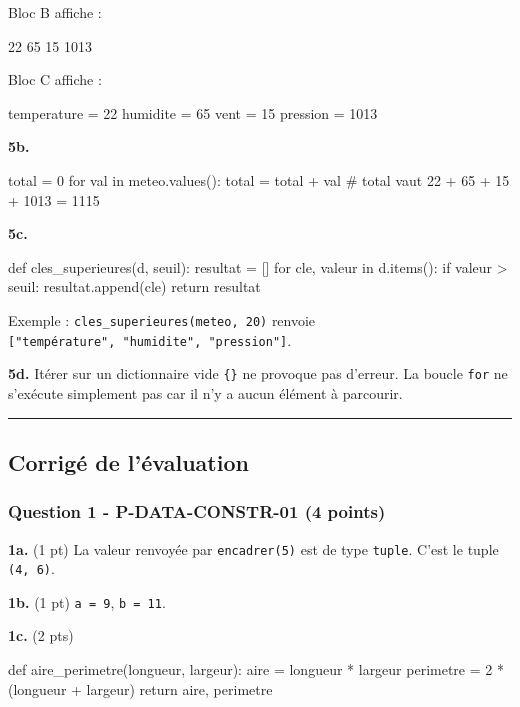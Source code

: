 Bloc B affiche :

\begin{python}
22
65
15
1013
\end{python}

Bloc C affiche :

\begin{python}
temperature = 22
humidite = 65
vent = 15
pression = 1013
\end{python}

\textbf{5b.}

\begin{python}
total = 0
for val in meteo.values():
    total = total + val
# total vaut 22 + 65 + 15 + 1013 = 1115
\end{python}

\textbf{5c.}

\begin{python}
def cles_superieures(d, seuil):
    resultat = []
    for cle, valeur in d.items():
        if valeur > seuil:
            resultat.append(cle)
    return resultat
\end{python}

Exemple : \texttt{cles\_superieures(meteo,\ 20)} renvoie
\texttt{{[}"température",\ "humidite",\ "pression"{]}}.

\textbf{5d.} Itérer sur un dictionnaire vide \texttt{\{\}} ne provoque
pas d'erreur. La boucle \texttt{for} ne s'exécute simplement pas car il
n'y a aucun élément à parcourir.

\begin{center}\rule{0.5\linewidth}{0.5pt}\end{center}

\subsection{Corrigé de l’évaluation}

\subsubsection{Question 1 - P-DATA-CONSTR-01 (4 points)}

\textbf{1a.} (1 pt) La valeur renvoyée par \texttt{encadrer(5)} est de
type \texttt{tuple}. C'est le tuple \texttt{(4,\ 6)}.

\textbf{1b.} (1 pt) \texttt{a\ =\ 9}, \texttt{b\ =\ 11}.

\textbf{1c.} (2 pts)

\begin{python}
def aire_perimetre(longueur, largeur):
    aire = longueur * largeur
    perimetre = 2 * (longueur + largeur)
    return aire, perimetre
\end{python}

